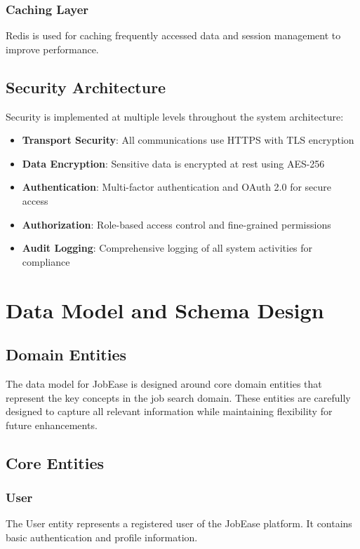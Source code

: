 \documentclass[12pt,a4paper]{report}
\begin{document}
\subsection{Caching Layer}
Redis is used for caching frequently accessed data and session management to improve performance.

\section{Security Architecture}
Security is implemented at multiple levels throughout the system architecture:

\begin{itemize}[leftmargin=2em]
  \item \textbf{Transport Security}: All communications use HTTPS with TLS encryption
  \item \textbf{Data Encryption}: Sensitive data is encrypted at rest using AES-256
  \item \textbf{Authentication}: Multi-factor authentication and OAuth 2.0 for secure access
  \item \textbf{Authorization}: Role-based access control and fine-grained permissions
  \item \textbf{Audit Logging}: Comprehensive logging of all system activities for compliance
\end{itemize}

\chapter{Data Model and Schema Design}

\section{Domain Entities}
The data model for JobEase is designed around core domain entities that represent the key concepts in the job search domain. These entities are carefully designed to capture all relevant information while maintaining flexibility for future enhancements.

\section{Core Entities}
\subsection{User}
The User entity represents a registered user of the JobEase platform. It contains basic authentication and profile information.
\end{document}

